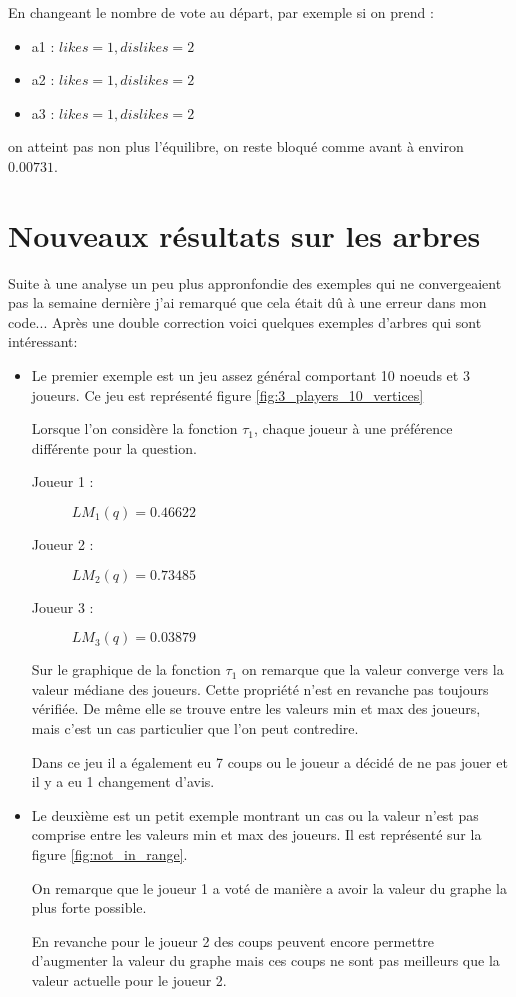 \documentclass[12pt]{article}
\theoremstyle{defi}
\theoremstyle{not}
\theoremstyle{prob}
\begin{document}
    En changeant le nombre de vote au départ, par exemple si on prend :
    \begin{itemize}
      \item a1 : $likes = 1, dislikes = 2$
      \item a2 : $likes = 1, dislikes = 2$
      \item a3 : $likes = 1, dislikes = 2$
    \end{itemize}

    on atteint pas non plus l'équilibre, on reste bloqué comme avant à environ $0.00731$.
  \color{black}
  \section{Nouveaux résultats sur les arbres}
  \color{red}
    Suite à une analyse un peu plus appronfondie des exemples qui ne convergeaient pas la semaine dernière j'ai remarqué que cela était dû à une erreur dans mon code...
  \color{black}
    Après une double correction voici quelques exemples d'arbres qui sont intéressant:\\

    \begin{itemize}
      \item Le premier exemple est un jeu assez général comportant 10 noeuds et 3 joueurs.
        Ce jeu est représenté figure \ref{fig:3_players_10_vertices}

        Lorsque l'on considère la fonction $\tau_1$, chaque joueur à une préférence différente pour la question.
        \begin{description}
          \item[Joueur 1 : ] $LM_1(q) = 0.46622$
          \item[Joueur 2 : ] $LM_2(q) = 0.73485$
          \item[Joueur 3 : ] $LM_3(q) = 0.03879$
        \end{description}

        Sur le graphique de la fonction $\tau_1$ on remarque que la valeur converge vers la valeur médiane des joueurs. Cette propriété n'est en revanche pas toujours vérifiée. De même elle se trouve entre les valeurs min et max des joueurs, mais c'est un cas particulier que l'on peut contredire.

        Dans ce jeu il a également eu 7 coups ou le joueur a décidé de ne pas jouer et il y a eu 1 changement d'avis.

      \item Le deuxième est un petit exemple montrant un cas ou la valeur n'est pas comprise entre les valeurs min et max des joueurs.
        Il est représenté sur la figure \ref{fig:not_in_range}.

        On remarque que le joueur 1 a voté de manière a avoir la valeur du graphe la plus forte possible.

        En revanche pour le joueur 2 des coups peuvent encore permettre d'augmenter la valeur du graphe mais ces coups ne sont pas meilleurs que la valeur actuelle pour le joueur 2.
    \end{itemize}
\end{document}
